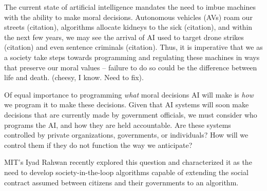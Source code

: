 The current state of artificial intelligence mandates the need to imbue machines with the ability to make moral decisions. Autonomous vehicles (AVs) roam our streets (citation), algorithms allocate kidneys to the sick (citation), and within the next few years, we may see the arrival of AI used to target drone strikes (citation) and even sentence criminals (citation). Thus, it is imperative that we as a society take steps towards programming and regulating these machines in ways that preserve our moral values -- failure to do so could be the difference between life and death. (cheesy, I know. Need to fix).

Of equal importance to programming \textit{what} moral decisions AI will make is \textit{how} we program it to make these decisions. Given that AI systems will soon make decisions that are currently made by government officials, we must consider who programs the AI, and how they are held accountable. Are these systems controlled by private organizations, governments, or individuals? How will we control them if they do not function the way we anticipate? 

MIT's Iyad Rahwan recently explored this question and characterized it as the need to develop society-in-the-loop algorithms capable of extending the social contract assumed between citizens and their governments to an algorithm. 

